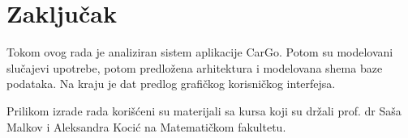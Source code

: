 \section{\bfseries Zaključak}

Tokom ovog rada je analiziran sistem aplikacije CarGo. Potom su modelovani slučajevi upotrebe, potom predložena arhitektura i modelovana shema baze podataka. Na kraju je dat predlog grafičkog korisničkog interfejsa.

Prilikom izrade rada korišćeni su materijali sa kursa koji su držali prof. dr Saša Malkov i Aleksandra
Kocić na Matematičkom fakultetu.\cite{predavanja}
